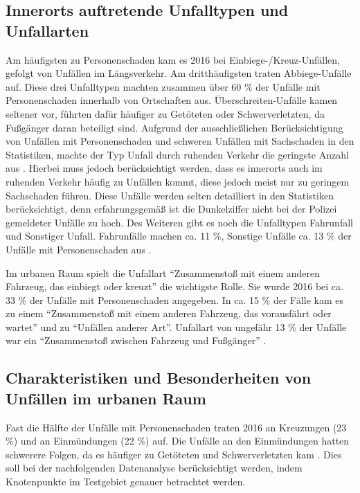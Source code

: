 \subsection{Innerorts auftretende Unfalltypen und Unfallarten }
Am häufigsten zu Personenschaden kam es 2016 bei Einbiege-/Kreuz-Unfällen, gefolgt von Unfällen im Längsverkehr. Am dritthäufigsten traten Abbiege-Unfälle auf. Diese drei Unfalltypen machten zusammen über 60 \% der Unfälle mit Personenschaden innerhalb von Ortschaften aus. Überschreiten-Unfälle kamen seltener vor, führten dafür häufiger zu Getöteten oder Schwerverletzten, da Fußgänger daran beteiligt sind. Aufgrund der ausschließlichen Berücksichtigung von Unfällen mit Personenschaden und schweren Unfällen mit Sachschaden in den Statistiken, machte der Typ Unfall durch ruhenden Verkehr die geringste Anzahl aus \parencite[S. 68]{StatistischesBundesamt.2017}. Hierbei muss jedoch berücksichtigt werden, dass es innerorts auch im ruhenden Verkehr häufig zu Unfällen kommt, diese jedoch meist nur zu geringem Sachschaden führen. Diese Unfälle werden selten detailliert in den Statistiken berücksichtigt, denn erfahrungsgemäß ist die Dunkelziffer nicht bei der Polizei gemeldeter Unfälle zu hoch. Des Weiteren gibt es noch die Unfalltypen Fahrunfall und Sonstiger Unfall. Fahrunfälle machen ca. 11 \%, Sonstige Unfälle ca. 13 \% der Unfälle mit Personenschaden aus \parencite[S. 68]{StatistischesBundesamt.2017}.

Im urbanen Raum spielt die Unfallart \enquote{Zusammenstoß mit einem anderen Fahrzeug, das einbiegt oder kreuzt} die wichtigste Rolle. Sie wurde 2016 bei ca. 33 \% der Unfälle mit Personenschaden angegeben. In ca. 15 \% der Fälle kam es zu einem \enquote{Zusammenstoß mit einem anderen Fahrzeug, das vorausfährt oder wartet} und zu \enquote{Unfällen anderer Art}. Unfallart von ungefähr 13 \% der Unfälle war ein \enquote{Zusammenstoß zwischen Fahrzeug und Fußgänger} \parencite[S. 74]{StatistischesBundesamt.2017}.

\subsection{Charakteristiken und Besonderheiten von Unfällen im urbanen Raum}\label{subsection:Charakteristiken und Besonderheiten von Unfällen im urbanen Raum}
Fast die Hälfte der Unfälle mit Personenschaden traten 2016 an Kreuzungen (23 \%) und an Einmündungen (22 \%) auf. Die Unfälle an den Einmündungen hatten schwerere Folgen, da es häufiger zu Getöteten und Schwerverletzten kam \parencite[S. 88]{StatistischesBundesamt.2017}. Dies soll bei der nachfolgenden Datenanalyse berücksichtigt werden, indem Knotenpunkte im Testgebiet genauer betrachtet werden.

